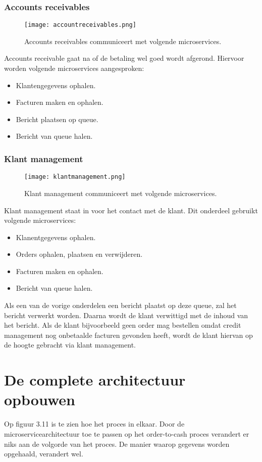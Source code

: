 \subsubsection{Accounts receivables}
\begin{figure}[h!]
	\texttt{[image: accountreceivables.png]}
	\caption{Accounts receivables communiceert met volgende microservices.}
	\centering
\end{figure}
Accounts receivable gaat na of de betaling wel goed wordt afgerond. Hiervoor worden volgende microservices aangesproken:
\begin{itemize}
	\item Klantengegevens ophalen.
	\item Facturen maken en ophalen.
	\item Bericht plaatsen op queue.
	\item Bericht van queue halen.
\end{itemize}

\subsubsection{Klant management}
\begin{figure}[h!]
	\texttt{[image: klantmanagement.png]}
	\caption{Klant management communiceert met volgende microservices.}
	\centering
\end{figure}
Klant management staat in voor het contact met de klant. Dit onderdeel gebruikt volgende microservices:
\begin{itemize}
	\item Klanentgegevens ophalen.
	\item Orders ophalen, plaatsen en verwijderen.
	\item Facturen maken en ophalen.
	\item Bericht van queue halen.
\end{itemize}
Als een van de vorige onderdelen een bericht plaatst op deze queue, zal het bericht verwerkt worden. Daarna wordt de klant verwittigd met de inhoud van het bericht. Als de klant bijvoorbeeld geen order mag bestellen omdat credit management nog onbetaalde facturen gevonden heeft, wordt de klant hiervan op de hoogte gebracht via klant management.


\section{De complete architectuur opbouwen}
Op figuur 3.11 is te zien hoe het proces in elkaar. Door de microservicearchitectuur toe te passen op het order-to-cash proces verandert er niks aan de volgorde van het proces. De manier waarop gegevens worden opgehaald, verandert wel. 


